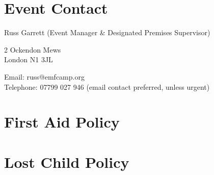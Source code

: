 \section{Event Contact}

Russ Garrett (Event Manager \& Designated Premises Supervisor)

2 Ockendon Mews \\
London N1 3JL

Email: russ@emfcamp.org \\
Telephone: 07799 027 946 (email contact preferred, unless urgent)

\newpage
\appendix

\section{First Aid Policy}
\label{first-aid-policy}

\newpage

\section{Lost Child Policy}
\label{lost-child-policy}


